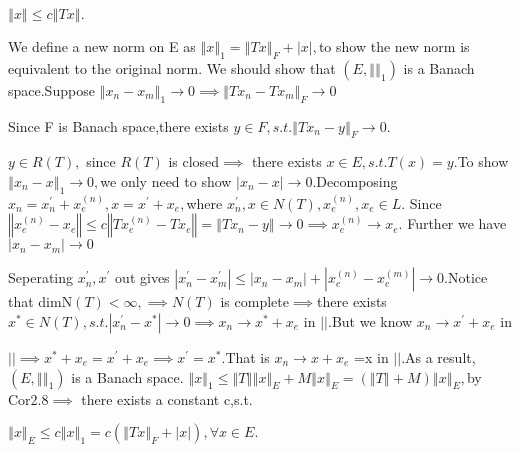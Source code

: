 \documentclass{article}
\begin{document}
$\left\Vert x\right\Vert \leq c\left\Vert Tx\right\Vert .$

We define a new norm on E as $\left\Vert x\right\Vert _{1}=\left\Vert
Tx\right\Vert _{F}+\left\vert x\right\vert ,$to show the new norm is
equivalent to the original norm. We should show that $\left( E,\left\Vert
{}\right\Vert _{1}\right) $ is a Banach space.Suppose $\left\Vert
x_{n}-x_{m}\right\Vert _{1}\rightarrow 0\implies \left\Vert
Tx_{n}-Tx_{m}\right\Vert _{F}\rightarrow 0$

Since F is Banach space,there exists $y\in F,s.t.\left\Vert
Tx_{n}-y\right\Vert _{F}\rightarrow 0.$

$y\in R\left( T\right) ,$ since $R\left( T\right) $ is closed$\implies $%
there exists $x\in E,s.t.T\left( x\right) =y.$To show $\left\Vert
x_{n}-x\right\Vert _{1}\rightarrow 0,$we only need to show $\left\vert
x_{n}-x\right\vert \rightarrow 0.$Decomposing $x_{n}=x_{n}^{\prime
}+x_{e}^{\left( n\right) },x=x^{\prime }+x_{e},$where $x_{n}^{\prime },x\in
N\left( T\right) ,x_{e}^{\left( n\right) },x_{e}\in L.$ Since $\left\Vert
x_{e}^{\left( n\right) }-x_{e}\right\Vert \leq c\left\Vert Tx_{e}^{\left(
n\right) }-Tx_{e}\right\Vert =\left\Vert Tx_{n}-y\right\Vert \rightarrow
0\implies x_{e}^{\left( n\right) }\rightarrow x_{e}.$ Further we have  $%
\left\vert x_{n}-x_{m}\right\vert \rightarrow 0$

Seperating $x_{n}^{\prime },x^{\prime }$ out gives $\left\vert x_{n}^{\prime
}-x_{m}^{\prime }\right\vert \leq \allowbreak \left\vert
x_{n}-x_{m}\right\vert +\left\vert x_{e}^{\left( n\right) }-x_{e}^{\left(
m\right) }\right\vert \rightarrow 0.$Notice that dimN$\left( T\right)
<\infty ,\implies N\left( T\right) $ is complete$\implies $there exists $%
x^{\ast }\in N\left( T\right) ,s.t.\left\vert x_{n}^{\prime }-x^{\ast
}\right\vert \rightarrow 0\implies x_{n}\rightarrow x^{\ast }+x_{e}$ in $%
\left\vert {}\right\vert .$But we know $x_{n}\rightarrow x^{\prime }+x_{e}$
in

$\left\vert {}\right\vert \implies x^{\ast }+x_{e}=x^{\prime }+x_{e}\implies
x^{\prime }=x^{\ast }.$That is $x_{n}\rightarrow x+x_{e}$ =x in $\left\vert
{}\right\vert .$As a result, $\left( E,\left\Vert {}\right\Vert _{1}\right) $
is a Banach space. $\left\Vert x\right\Vert _{1}\leq \left\Vert T\right\Vert
\left\Vert x\right\Vert _{E}+M\left\Vert x\right\Vert _{E}=\left( \left\Vert
T\right\Vert +M\right) \left\Vert x\right\Vert _{E},$by Cor2.8$\implies $%
there exists a constant c,s.t.

$\left\Vert x\right\Vert _{E}\leq c\left\Vert x\right\Vert _{1}=c\left(
\left\Vert Tx\right\Vert _{F}+\left\vert x\right\vert \right) ,\forall x\in
E.$
\end{document}
